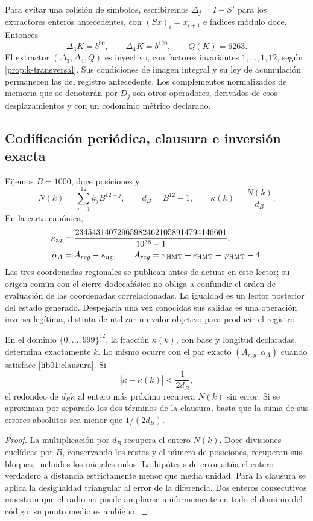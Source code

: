 Para evitar una colisión de símbolos, escribiremos
\(\Delta_j=I-S^j\) para los extractores enteros antecedentes, con
\((Sx)_i=x_{i+1}\) e índices módulo doce. Entonces
\[
 \Delta_3K=b^{90},\qquad \Delta_4K=b^{120},\qquad Q(K)=6263.
\]
El extractor \((\Delta_3,\Delta_4,Q)\) es inyectivo, con factores
invariantes \(1,\ldots,1,12\), según \cref{prop:k-transversal}. Sus
condiciones de imagen integral y su ley de acumulación permanecen las del
registro antecedente. Los complementos normalizados de memoria que se
denotarán por \(D_j\) son otros operadores, derivados de esos
desplazamientos y con un codominio métrico declarado.

\subsection{Codificación periódica, clausura e inversión exacta}
\label{lib01:kappa}

Fijemos \(B=1000\), doce posiciones y
\[
 N(k)=\sum_{j=1}^{12}k_jB^{12-j},\qquad d_B=B^{12}-1,
 \qquad \kappa(k)=\frac{N(k)}{d_B}.
\]
En la carta canónica,
\begin{equation}
 \begin{aligned}
 \kappa_{\rm ag}
 &=\frac{234543140729659824621058914794146601}{10^{36}-1},\\
 \alpha_A&=A_{reg}-\kappa_{\rm ag},\qquad
 A_{reg}=\pi_{\rm HMT}+e_{\rm HMT}-\varphi_{\rm HMT}-4.
 \end{aligned}
 \label{lib01:clausura}
\end{equation}
Las tres coordenadas regionales se publican antes de actuar en este lector;
su origen común con el cierre dodecafásico no obliga a confundir el orden de
evaluación de las coordenadas correlacionadas. La igualdad es un lector
posterior del estado generado. Despejarla una vez conocidas sus salidas es
una operación inversa legítima, distinta de utilizar un valor objetivo para
producir el registro.

\begin{proposition}
\label{lib01:inversion-kappa}
En el dominio \(\{0,\ldots,999\}^{12}\), la fracción \(\kappa(k)\),
con base y longitud declaradas, determina exactamente \(k\). Lo mismo
ocurre con el par exacto \((A_{reg},\alpha_A)\) cuando satisface
\eqref{lib01:clausura}. Si
\[
 |\widetilde\kappa-\kappa(k)|<\frac1{2d_B},
\]
el redondeo de \(d_B\widetilde\kappa\) al entero más próximo recupera
\(N(k)\) sin error. Si se aproximan por separado los dos términos de la
clausura, basta que la suma de sus errores absolutos sea menor que
\(1/(2d_B)\).
\end{proposition}
\begin{proof}
La multiplicación por \(d_B\) recupera el entero \(N(k)\).
Doce divisiones euclídeas por \(B\), conservando los restos y el número
de posiciones, recuperan sus bloques, incluidos los iniciales nulos. La
hipótesis de error sitúa el entero verdadero a distancia estrictamente
menor que media unidad. Para la clausura se aplica la desigualdad
triangular al error de la diferencia. Dos enteros consecutivos muestran
que el radio no puede ampliarse uniformemente en todo el dominio del
código: su punto medio es ambiguo.
\end{proof}

